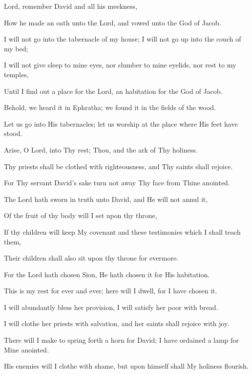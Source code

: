 Lord, remember David and all his meekness,

How he made an oath unto the Lord, and vowed unto the God of Jacob.

I will not go into the tabernacle of my house; I will not go up into the couch of my bed;

I will not give sleep to mine eyes, nor slumber to mine eyelids, nor rest to my temples,

Until I find out a place for the Lord, an habitation for the God of Jacob.

Behold, we heard it in Ephratha; we found it in the fields of the wood.

Let us go into His tabernacles; let us worship at the place where His feet have stood.

Arise, O Lord, into Thy rest; Thou, and the ark of Thy holiness.

Thy priests shall be clothed with righteousness, and Thy saints shall rejoice.

For Thy servant David's sake turn not away Thy face from Thine anointed.

The Lord hath sworn in truth unto David, and He will not annul it,

Of the fruit of thy body will I set upon thy throne,

If thy children will keep My covenant and these testimonies which I shall teach them,

Their children shall also sit upon thy throne for evermore.

For the Lord hath chosen Sion, He hath chosen it for His habitation.

This is my rest for ever and ever; here will I dwell, for I have chosen it.

I will abundantly bless her provision, I will satisfy her poor with bread.

I will clothe her priests with salvation, and her saints shall rejoice with joy.

There will I make to spring forth a horn for David; I have ordained a lamp for Mine anointed.

His enemies will I clothe with shame, but upon himself shall My holiness flourish.

